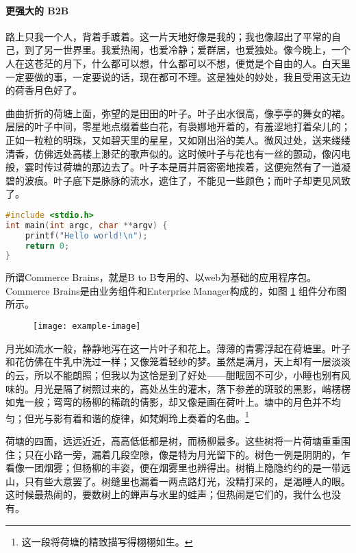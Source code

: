 \documentclass[printMode]{ecnuthesis}
\begin{document}
\paragraph{更强大的 B2B}

路上只我一个人，背着手踱着。这一片天地好像是我的；我也像超出了平常的自己，到了另一世界里。我爱热闹，也爱冷静；爱群居，也爱独处。像今晚上，一个人在这苍茫的月下，什么都可以想，什么都可以不想，便觉是个自由的人。白天里一定要做的事，一定要说的话，现在都可不理。这是独处的妙处，我且受用这无边的荷香月色好了。

曲曲折折的荷塘上面，弥望的是田田的叶子。叶子出水很高，像亭亭的舞女的裙。层层的叶子中间，零星地点缀着些白花，有袅娜地开着的，有羞涩地打着朵儿的；正如一粒粒的明珠，又如碧天里的星星，又如刚出浴的美人。微风过处，送来缕缕清香，仿佛远处高楼上渺茫的歌声似的。这时候叶子与花也有一丝的颤动，像闪电般，霎时传过荷塘的那边去了。叶子本是肩并肩密密地挨着，这便宛然有了一道凝碧的波痕。叶子底下是脉脉的流水，遮住了，不能见一些颜色；而叶子却更见风致了。
\begin{lstlisting}[language=C++]
#include <stdio.h>
int main(int argc, char **argv) {
    printf("Hello world!\n");
    return 0;
}
\end{lstlisting}

所谓Commerce Brains，就是B to B专用的、以web为基础的应用程序包。Commerce Brains是由业务组件和Enterprise Manager构成的，如图 \ref{fig-1} 组件分布图所示。
\begin{figure}[htb]
  \centering
  \texttt{[image: example-image]}
  \label{fig-1}
\end{figure}

月光如流水一般，静静地泻在这一片叶子和花上。薄薄的青雾浮起在荷塘里。叶子和花仿佛在牛乳中洗过一样；又像笼着轻纱的梦。虽然是满月，天上却有一层淡淡的云，所以不能朗照；但我以为这恰是到了好处——酣眠固不可少，小睡也别有风味的。月光是隔了树照过来的，高处丛生的灌木，落下参差的斑驳的黑影，峭楞楞如鬼一般；弯弯的杨柳的稀疏的倩影，却又像是画在荷叶上。塘中的月色并不均匀；但光与影有着和谐的旋律，如梵婀玲上奏着的名曲。\footnote{这一段将荷塘的精致描写得栩栩如生。}

荷塘的四面，远远近近，高高低低都是树，而杨柳最多。这些树将一片荷塘重重围住；只在小路一旁，漏着几段空隙，像是特为月光留下的。树色一例是阴阴的，乍看像一团烟雾；但杨柳的丰姿，便在烟雾里也辨得出。树梢上隐隐约约的是一带远山，只有些大意罢了。树缝里也漏着一两点路灯光，没精打采的，是渴睡人的眼。这时候最热闹的，要数树上的蝉声与水里的蛙声；但热闹是它们的，我什么也没有。
\end{document}
